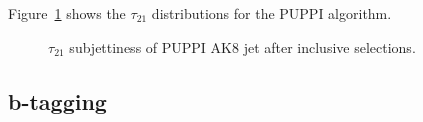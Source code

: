 Figure~\ref{fig:fatjet_pre_tau21} shows the $\tau_{21}$ distributions for the PUPPI algorithm.

\begin{figure}[!htb]
  \begin{center}
  \end{center}
  \caption{$\tau_{21}$ subjettiness of PUPPI AK8 jet after inclusive selections.}
  \label{fig:fatjet_pre_tau21}
\end{figure}



\subsection{b-tagging}\label{ssec:btagging}
 
